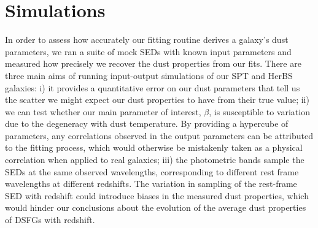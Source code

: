 \section{Simulations}
\label{sec:simulations}

In order to assess how accurately our fitting routine derives a galaxy's dust parameters, we ran a suite of mock SEDs with known input parameters and measured how precisely we recover the dust properties from our fits. There are three main aims of running input-output simulations of our SPT and HerBS galaxies: i) it provides a quantitative error on our dust parameters that tell us the scatter we might expect our dust properties to have from their true value; ii) we can test whether our main parameter of interest, $\beta$, is susceptible to variation due to the degeneracy with dust temperature. By providing a hypercube of parameters, any correlations observed in the output parameters can be attributed to the fitting process, which would otherwise be mistakenly taken as a physical correlation when applied to real galaxies; iii) the photometric bands sample the SEDs at the same observed wavelengths, corresponding to different rest frame wavelengths at different redshifts. The variation in sampling of the rest-frame SED with redshift could introduce biases in the measured dust properties, which would hinder our conclusions about the evolution of the average dust properties of DSFGs with redshift.

